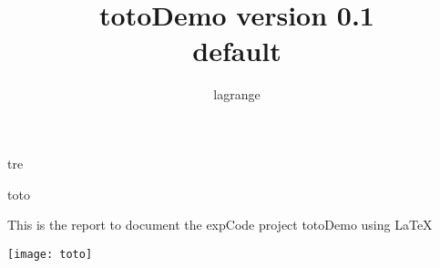 \documentclass[10pt,a4paper,fleqn]{article}
\title{totoDemo version 0.1\\ default}
\author{ lagrange }
\begin{document}
 
  
\maketitle 
  
tre

toto

  
This is the report to document the expCode project totoDemo using \LaTeX 
  
\texttt{[image: toto]}


  
  
% 
% 
  
\end{document}
